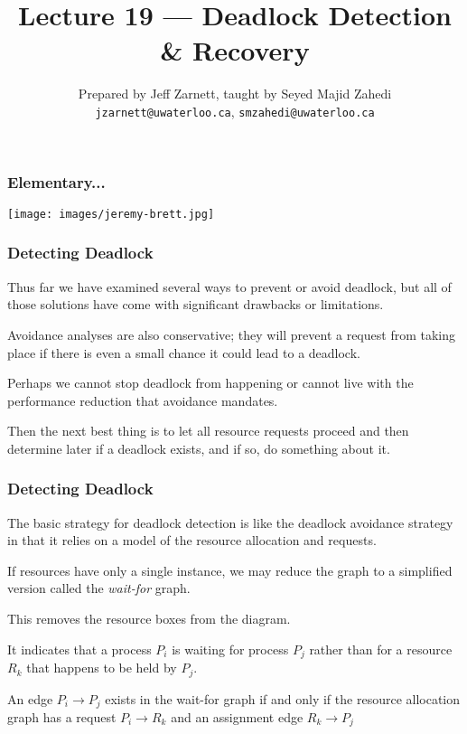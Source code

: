 

\title{Lecture 19 --- Deadlock Detection \& Recovery }

\author{Prepared by Jeff Zarnett, taught by Seyed Majid Zahedi \\ \small \texttt{jzarnett@uwaterloo.ca}, \texttt{smzahedi@uwaterloo.ca}}
\date{}




\begin{frame}
	\titlepage

\end{frame}


\begin{frame}
	\frametitle{Elementary...}

	\begin{center}
		\texttt{[image: images/jeremy-brett.jpg]}
	\end{center}

\end{frame}


\begin{frame}
	\frametitle{Detecting Deadlock}

	Thus far we have examined several ways to prevent or avoid deadlock, but all of those solutions have come with significant drawbacks or limitations.

	Avoidance analyses are also conservative; they will prevent a request from taking place if there is even a small chance it could lead to a deadlock.

	Perhaps we cannot stop deadlock from happening or cannot live with the performance reduction that avoidance mandates.

	Then the next best thing is to let all resource requests proceed and then determine later if a deadlock exists, and if so, do something about it.

\end{frame}


\begin{frame}
	\frametitle{Detecting Deadlock}

	The basic strategy for deadlock detection is like the deadlock avoidance strategy in that it relies on a model of the resource allocation and requests.

	If resources have only a single instance, we may reduce the graph to a simplified version called the \textit{wait-for} graph.

	This removes the resource boxes from the diagram.

	It indicates that a process $P_{i}$ is waiting for process $P_{j}$ rather than for a resource $R_{k}$ that happens to be held by $P_{j}$.

	An edge $P_{i} \rightarrow P_{j}$ exists in the wait-for graph if and only if the resource allocation graph has a request $P_{i} \rightarrow R_{k}$ and an assignment edge $R_{k} \rightarrow P_{j}$

\end{frame}

